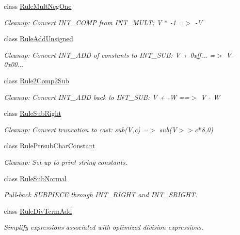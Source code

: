 \begin{DoxyCompactItemize}
class \mbox{\hyperlink{class_rule_mult_neg_one}{Rule\+Mult\+Neg\+One}}
\begin{DoxyCompactList}\small\item\em Cleanup\+: Convert I\+N\+T\+\_\+C\+O\+MP from I\+N\+T\+\_\+\+M\+U\+LT\+: {\ttfamily V $\ast$ -\/1 =$>$ -\/V} \end{DoxyCompactList}\item 
class \mbox{\hyperlink{class_rule_add_unsigned}{Rule\+Add\+Unsigned}}
\begin{DoxyCompactList}\small\item\em Cleanup\+: Convert I\+N\+T\+\_\+\+A\+DD of constants to I\+N\+T\+\_\+\+S\+UB\+: {\ttfamily V + 0xff... =$>$ V -\/ 0x00...} \end{DoxyCompactList}\item 
class \mbox{\hyperlink{class_rule2_comp2_sub}{Rule2\+Comp2\+Sub}}
\begin{DoxyCompactList}\small\item\em Cleanup\+: Convert I\+N\+T\+\_\+\+A\+DD back to I\+N\+T\+\_\+\+S\+UB\+: {\ttfamily V + -\/W ==$>$ V -\/ W} \end{DoxyCompactList}\item 
class \mbox{\hyperlink{class_rule_sub_right}{Rule\+Sub\+Right}}
\begin{DoxyCompactList}\small\item\em Cleanup\+: Convert truncation to cast\+: {\ttfamily sub(\+V,c) =$>$ sub(V$>$$>$c$\ast$8,0)} \end{DoxyCompactList}\item 
class \mbox{\hyperlink{class_rule_ptrsub_char_constant}{Rule\+Ptrsub\+Char\+Constant}}
\begin{DoxyCompactList}\small\item\em Cleanup\+: Set-\/up to print string constants. \end{DoxyCompactList}\item 
class \mbox{\hyperlink{class_rule_sub_normal}{Rule\+Sub\+Normal}}
\begin{DoxyCompactList}\small\item\em Pull-\/back S\+U\+B\+P\+I\+E\+CE through I\+N\+T\+\_\+\+R\+I\+G\+HT and I\+N\+T\+\_\+\+S\+R\+I\+G\+HT. \end{DoxyCompactList}\item 
class \mbox{\hyperlink{class_rule_div_term_add}{Rule\+Div\+Term\+Add}}
\begin{DoxyCompactList}\small\item\em Simplify expressions associated with optimized division expressions. \end{DoxyCompactList}\item 

\end{DoxyCompactItemize}
